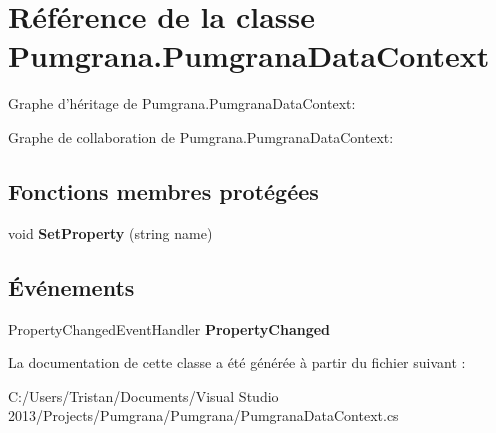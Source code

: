 \hypertarget{class_pumgrana_1_1_pumgrana_data_context}{\section{Référence de la classe Pumgrana.\+Pumgrana\+Data\+Context}
\label{class_pumgrana_1_1_pumgrana_data_context}
}


Graphe d'héritage de Pumgrana.\+Pumgrana\+Data\+Context\+:


Graphe de collaboration de Pumgrana.\+Pumgrana\+Data\+Context\+:
\subsection*{Fonctions membres protégées}
\begin{DoxyCompactItemize}
\item 
\hypertarget{class_pumgrana_1_1_pumgrana_data_context_a9b85d9f9e5fec0c7d3f921945ad28931}{void {\bfseries Set\+Property} (string name)}\label{class_pumgrana_1_1_pumgrana_data_context_a9b85d9f9e5fec0c7d3f921945ad28931}

\end{DoxyCompactItemize}
\subsection*{Événements}
\begin{DoxyCompactItemize}
\item 
\hypertarget{class_pumgrana_1_1_pumgrana_data_context_aec1c85789556b2b42db25437d96f8e69}{Property\+Changed\+Event\+Handler {\bfseries Property\+Changed}}\label{class_pumgrana_1_1_pumgrana_data_context_aec1c85789556b2b42db25437d96f8e69}

\end{DoxyCompactItemize}


La documentation de cette classe a été générée à partir du fichier suivant \+:\begin{DoxyCompactItemize}
\item 
C\+:/\+Users/\+Tristan/\+Documents/\+Visual Studio 2013/\+Projects/\+Pumgrana/\+Pumgrana/Pumgrana\+Data\+Context.\+cs\end{DoxyCompactItemize}
